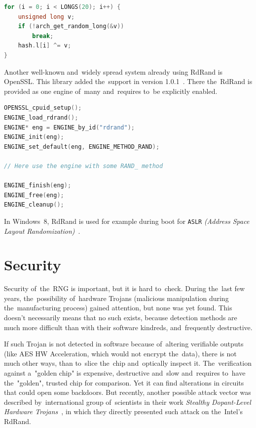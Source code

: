 \begin{lstlisting}[frame=none, basicstyle=\footnotesize\ttfamily, language=C, numbers=none, numberstyle=\tiny\color{black},caption= {Adding RdRand (and~any other platform-depending HW RNG) to~blocking pool with XOR, at line 1042 in {\tt drivers/char/random.c}~\cite{random.c}. }]
for (i = 0; i < LONGS(20); i++) {
	unsigned long v;
	if (!arch_get_random_long(&v))
		break;
	hash.l[i] ^= v;
}
\end{lstlisting}

\par{
Another well-known and~widely spread system already using RdRand is OpenSSL. This library added the~support in version 1.0.1~\cite[Chapter. 3.2 Generation]{OpenSSLRandomNumbers}. There the~RdRand is provided as one engine of~many and~requires to~be explicitly enabled.
}

\begin{lstlisting}[frame=none, basicstyle=\footnotesize\ttfamily, language=C, numbers=none, numberstyle=\tiny\color{black},caption= {Simplified example of~usage of~RdRand in OpenSSL~\cite{OpenSSLRandomNumbers}. }]
OPENSSL_cpuid_setup();
ENGINE_load_rdrand();
ENGINE* eng = ENGINE_by_id("rdrand");
ENGINE_init(eng);
ENGINE_set_default(eng, ENGINE_METHOD_RAND);

// Here use the engine with some RAND_ method

ENGINE_finish(eng);
ENGINE_free(eng);
ENGINE_cleanup();
\end{lstlisting}

\par{
In Windows~8, RdRand is used for example during boot for {\tt ASLR} {\em (Address Space Layout Randomization)}~\cite{WindowsASLR,WindowsHeap}.
}

\section{Security}\label{sec:security}
\par{
Security of~the~RNG is important, but it is hard to~check. During the~last few years,
 the~possibility of~hardware Trojans (malicious manipulation during 
 the~manufacturing process) gained attention, but none was yet found. This doesn't 
necessarily means that no such exists, because detection methods are 
much more difficult than with their software kindreds, and~frequently destructive. 
}

\par{
If such Trojan is not detected in software because of~altering verifiable outputs 
(like AES HW Acceleration, which would not encrypt the~data), 
there is not much other ways, than to~slice the~chip and~optically inspect it. 
The~verification against a~"golden chip" is expensive, destructive and~slow 
and~requires to~have the~"golden", trusted chip for comparison.
Yet it can find alterations in circuits that could open some backdoors. 
But recently, another possible attack vector was described by~international group
 of~scientists in their work {\em Stealthy Dopant-Level Hardware Trojans}~\cite{DopantAttack}, 
 in which they directly presented such attack on the~Intel's RdRand.
}

